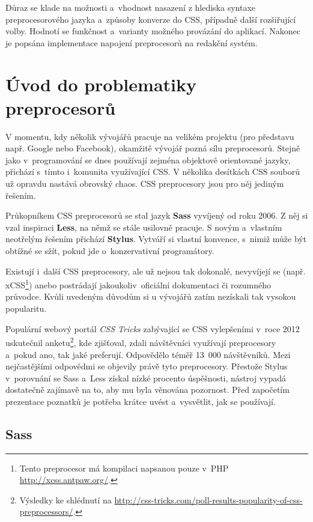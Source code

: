 \documentclass[thesis=B,czech]{FITthesis}[2012/06/26]
\begin{document}
Důraz se klade na možnosti a~vhodnost nasazení z hlediska syntaxe preprocesorového jazyka a~způsoby konverze do CSS, případně další rozšiřující volby. Hodnotí se funkčnost a~varianty možného provázání do aplikací. Nakonec je popsána implementace napojení preprocesorů na redakční systém.


\section{Úvod do problematiky preprocesorů}


V momentu, kdy několik vývojářů pracuje na velikém projektu (pro představu např. Google nebo Facebook), okamžitě vývojář pozná sílu preprocesorů. Stejně jako v~programování se dnes používají zejména objektově orientované jazyky, přichází s~tímto i~komunita využívající CSS. V několika desítkách CSS souborů už opravdu nastává obrovský chaos. CSS preprocesory jsou pro něj jediným řešením.

Průkopníkem CSS preprocesorů se stal jazyk \textbf{Sass} vyvíjený od roku 2006. Z něj si vzal inspiraci \textbf{Less}, na němž se stále usilovně pracuje. S novým a~vlastním neotřelým řešením přichází \textbf{Stylus}. Vytváří si vlastní konvence, s~nimiž může být obtížné se sžít, pokud jde o~konzervativní programátory. 

Existují i~další CSS preprocesory, ale už nejsou tak dokonalé, nevyvíjejí se (např. xCSS\footnote{Tento preprocesor má kompilaci napsanou pouze v~PHP \url{http://xcss.antpaw.org/}.}) anebo postrádají jakoukoliv~oficiální dokumentaci či rozumného průvodce. Kvůli uvedeným důvodům si u vývojářů zatím nezískali tak vysokou popularitu.

Populární webový portál \textit{CSS Tricks} zabývající se CSS vylepšeními v~roce 2012 uskutečnil anketu\footnote{Výsledky ke shlédnutí na \url{http://css-tricks.com/poll-results-popularity-of-css-preprocessors/}.}, kde zjišťoval, zdali návštěvníci využívají preprocesory a~pokud ano, tak jaké preferují. Odpovědělo téměř 13~000 návštěvníků. Mezi nejčastějšími odpovědmi se objevily právě tyto preprocesory. Přestože Stylus v~porovnání se Sass a~Less získal nízké procento úspěšnosti, nástroj vypadá dostatečně zajímavě na to, aby mu byla věnována pozornost. Před započetím prezentace poznatků je potřeba krátce uvést a~vysvětlit, jak se používají. 


\subsection{Sass}
\end{document}
